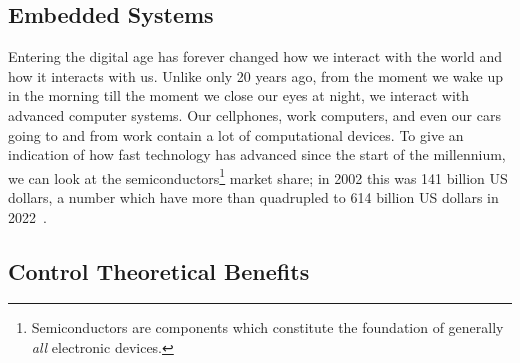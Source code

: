 \subsection*{Embedded Systems}%
%
%

Entering the digital age has forever changed how we interact with the world and how it interacts with us.
Unlike only 20 years ago, from the moment we wake up in the morning till the moment we close our eyes at night, we interact with advanced computer systems.
Our cellphones, work computers, and even our cars going to and from work contain a lot of computational devices.
To give an indication of how fast technology has advanced since the start of the millennium, we can look at the semiconductors\footnote{Semiconductors are components which constitute the foundation of generally \emph{all} electronic devices.} market share; in 2002 this was 141 billion US dollars, a number which have more than quadrupled to 614 billion US dollars in 2022~\cite{statista:2022}.



\begin{figure}[t]
    \centering
    \caption{}%
    \label{fig:embedded-system}%
\end{figure}

%

%


\subsection*{Control Theoretical Benefits}%
%
%

